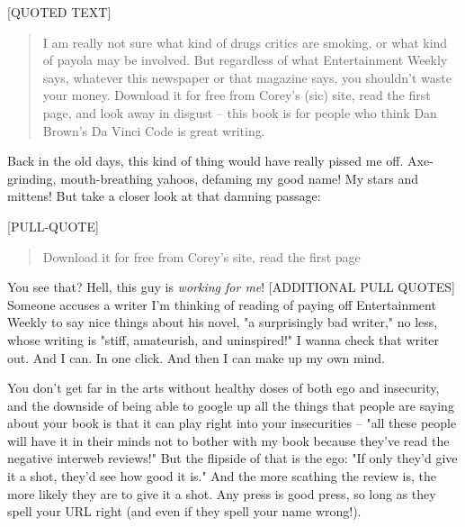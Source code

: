 [QUOTED TEXT]

\begin{quote}
I am really not sure what kind of drugs critics are smoking, or
what kind of payola may be involved. But regardless of what
Entertainment Weekly says, whatever this newspaper or that magazine
says, you shouldn't waste your money. Download it for free from
Corey's (sic) site, read the first page, and look away in disgust
-- this book is for people who think Dan Brown's Da Vinci Code is
great writing.

\end{quote}
Back in the old days, this kind of thing would have really pissed
me off. Axe-grinding, mouth-breathing yahoos, defaming my good
name! My stars and mittens! But take a closer look at that damning
passage:

[PULL-QUOTE]

\begin{quote}
Download it for free from Corey's site, read the first page

\end{quote}
You see that? Hell, this guy is \emph{working for me}!
[ADDITIONAL PULL QUOTES] Someone accuses a writer I'm thinking of
reading of paying off Entertainment Weekly to say nice things about
his novel, "a surprisingly bad writer," no less, whose writing is
"stiff, amateurish, and uninspired!" I wanna check that writer out.
And I can. In one click. And then I can make up my own mind.

You don't get far in the arts without healthy doses of both ego and
insecurity, and the downside of being able to google up all the
things that people are saying about your book is that it can play
right into your insecurities -- "all these people will have it in
their minds not to bother with my book because they've read the
negative interweb reviews!" But the flipside of that is the ego:
"If only they'd give it a shot, they'd see how good it is." And the
more scathing the review is, the more likely they are to give it a
shot. Any press is good press, so long as they spell your URL right
(and even if they spell your name wrong!).

